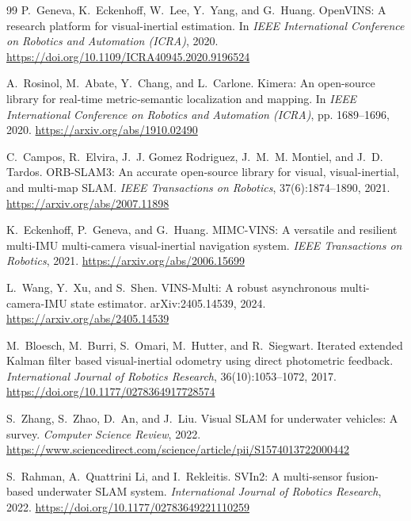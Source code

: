 \documentclass[11pt,a4paper]{article}
\begin{document}
\begin{thebibliography}{99}
P.~Geneva, K.~Eckenhoff, W.~Lee, Y.~Yang, and G.~Huang.
\newblock OpenVINS: A research platform for visual-inertial estimation.
\newblock In \textit{IEEE International Conference on Robotics and Automation (ICRA)}, 2020.
\newblock \url{https://doi.org/10.1109/ICRA40945.2020.9196524}

A.~Rosinol, M.~Abate, Y.~Chang, and L.~Carlone.
\newblock Kimera: An open-source library for real-time metric-semantic localization and mapping.
\newblock In \textit{IEEE International Conference on Robotics and Automation (ICRA)}, pp. 1689--1696, 2020.
\newblock \url{https://arxiv.org/abs/1910.02490}

C.~Campos, R.~Elvira, J.~J. Gomez Rodriguez, J.~M.~M. Montiel, and J.~D. Tardos.
\newblock ORB-SLAM3: An accurate open-source library for visual, visual-inertial, and multi-map SLAM.
\newblock \textit{IEEE Transactions on Robotics}, 37(6):1874--1890, 2021.
\newblock \url{https://arxiv.org/abs/2007.11898}

K.~Eckenhoff, P.~Geneva, and G.~Huang.
\newblock MIMC-VINS: A versatile and resilient multi-IMU multi-camera visual-inertial navigation system.
\newblock \textit{IEEE Transactions on Robotics}, 2021.
\newblock \url{https://arxiv.org/abs/2006.15699}

L.~Wang, Y.~Xu, and S.~Shen.
\newblock VINS-Multi: A robust asynchronous multi-camera-IMU state estimator.
\newblock arXiv:2405.14539, 2024.
\newblock \url{https://arxiv.org/abs/2405.14539}

M.~Bloesch, M.~Burri, S.~Omari, M.~Hutter, and R.~Siegwart.
\newblock Iterated extended Kalman filter based visual-inertial odometry using direct photometric feedback.
\newblock \textit{International Journal of Robotics Research}, 36(10):1053--1072, 2017.
\newblock \url{https://doi.org/10.1177/0278364917728574}

S.~Zhang, S.~Zhao, D.~An, and J.~Liu.
\newblock Visual SLAM for underwater vehicles: A survey.
\newblock \textit{Computer Science Review}, 2022.
\newblock \url{https://www.sciencedirect.com/science/article/pii/S1574013722000442}

S.~Rahman, A.~Quattrini Li, and I.~Rekleitis.
\newblock SVIn2: A multi-sensor fusion-based underwater SLAM system.
\newblock \textit{International Journal of Robotics Research}, 2022.
\newblock \url{https://doi.org/10.1177/02783649221110259}


\end{thebibliography}
\end{document}
